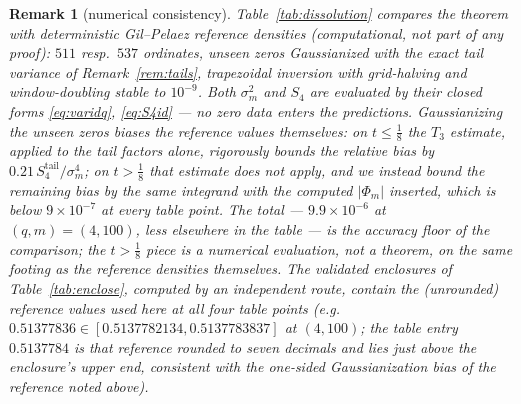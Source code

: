 \documentclass[11pt]{article}
\newtheorem{remark}{Remark}
\begin{document}
\begin{remark}[numerical consistency]\label{rem:dissolution-numerics}
Table~\ref{tab:dissolution} compares the theorem with deterministic
Gil--Pelaez reference densities (computational, not part of any
proof): $511$ resp.\ $537$ ordinates, unseen zeros Gaussianized with
the \emph{exact} tail variance of Remark~\ref{rem:tails}, trapezoidal
inversion with grid-halving and window-doubling stable to
$10^{-9}$. Both $\sigma_m^2$ and $S_4$ are evaluated by their closed
forms \eqref{eq:varidq}, \eqref{eq:S4id} --- no zero data enters the
predictions. Gaussianizing the unseen zeros biases the \emph{reference}
values themselves: on $t\le\tfrac18$ the $T_3$ estimate, applied to
the tail factors alone, rigorously bounds the relative bias by
$0.21\,S_4^{\mathrm{tail}}/\sigma_m^4$; on $t>\tfrac18$ that estimate
does not apply, and we instead bound the remaining bias by the same
integrand with the \emph{computed} $|\Phi_m|$ inserted, which is below
$9\times10^{-7}$ at every table point. The total ---
$9.9\times10^{-6}$ at $(q,m)=(4,100)$, less elsewhere in the table ---
is the accuracy floor of the comparison; the $t>\tfrac18$ piece is a
numerical evaluation, not a theorem, on the same footing as the
reference densities themselves. The validated enclosures of Table~\ref{tab:enclose},
computed by an independent route, contain the (unrounded) reference
values used here at all four table points (e.g.\
$0.51377836\in[0.5137782134,0.5137783837]$ at $(4,100)$; the table
entry $0.5137784$ is that reference rounded to seven decimals and lies
just above the enclosure's upper end, consistent with the one-sided
Gaussianization bias of the reference noted above).


\end{remark}
\end{document}
